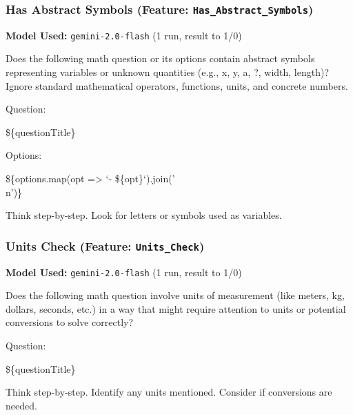 \documentclass[
    a4paper, %
    10pt, %
    twoside, %
]{LTJournalArticle}
\begin{document}
\subsubsection{Has Abstract Symbols (Feature: \texttt{Has\_Abstract\_Symbols})}
\label{app:prompt_has_abstract_symbols}
\textbf{Model Used:} \texttt{gemini-2.0-flash} (1 run, result to 1/0)
\begin{promptbox}
Does the following math question or its options contain abstract symbols representing variables or unknown quantities (e.g., x, y, a, ?, width, length)? Ignore standard mathematical operators, functions, units, and concrete numbers.

\vspace{1em}

Question:

\$\{questionTitle\}

\vspace{1em}

Options:

\$\{options.map(opt => `- \$\{opt\}`).join('\\n')\}

\vspace{1em}

Think step-by-step. Look for letters or symbols used as variables.
\end{promptbox}

\subsubsection{Units Check (Feature: \texttt{Units\_Check})}
\label{app:prompt_units_check}
\textbf{Model Used:} \texttt{gemini-2.0-flash} (1 run, result to 1/0)
\begin{promptbox}
Does the following math question involve units of measurement (like meters, kg, dollars, seconds, etc.) in a way that might require attention to units or potential conversions to solve correctly?

\vspace{1em}

Question:

\$\{questionTitle\}

\vspace{1em}

Think step-by-step. Identify any units mentioned. Consider if conversions are needed.
\end{promptbox}
\end{document}
